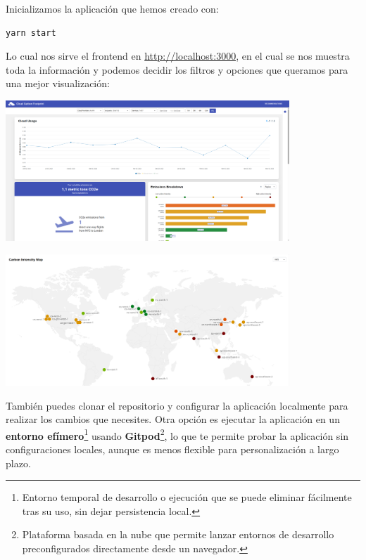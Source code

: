 \documentclass[12pt,a4paper]{report}
\begin{document}
Inicializamos la aplicación que hemos creado con:

\begin{tcolorbox}[colback=codebackground, colframe=codeborder, boxrule=0.8pt, arc=0mm, boxsep=5pt, left=5pt, right=5pt, top=5pt, bottom=5pt]
  \begin{lstlisting}[language=bash]
  yarn start
  \end{lstlisting}
\end{tcolorbox}

Lo cual nos sirve el frontend en
\href{http://localhost:3000}{http://localhost:3000}, en el cual se nos muestra
toda la información y podemos decidir los filtros y opciones que queramos para
una mejor visualización:

\begin{center}
  \includegraphics[width=0.8\textwidth]{imagenes/CCF_1.png}
\end{center}

\begin{center}
  \includegraphics[width=0.8\textwidth]{imagenes/CCF_2.png}
\end{center}

También puedes clonar el repositorio y configurar la aplicación localmente para
realizar los cambios que necesites. Otra opción es ejecutar la aplicación en un
\textbf{entorno efímero}\footnote{Entorno temporal de desarrollo o ejecución
  que se puede eliminar fácilmente tras su uso, sin dejar persistencia local.}
usando \textbf{Gitpod}\footnote{Plataforma basada en la nube que permite lanzar
  entornos de desarrollo preconfigurados directamente desde un navegador.}, lo
que te permite probar la aplicación sin configuraciones locales, aunque es
menos flexible para personalización a largo plazo.
\end{document}
